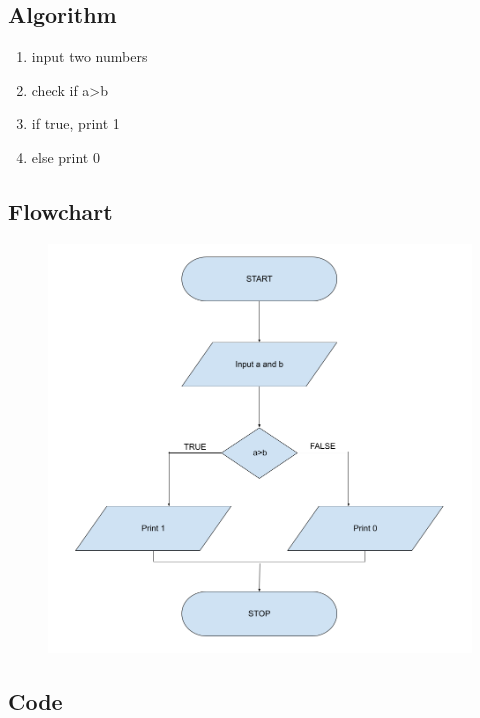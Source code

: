 \documentclass[12pt]{article}
\begin{document}
\subsection{Algorithm}
\begin{enumerate}
    \item input two numbers
    \item check if a>b
    \item if true, print 1
    \item else print 0
\end{enumerate}
\subsection{Flowchart}
\begin{figure}[h]
    \centering
    \includegraphics[width=1.0\textwidth]{Flowchart04c.png}
\end{figure}
\newpage
\subsection{Code}
\inputminted{c}{q4c.c}
\end{document}
